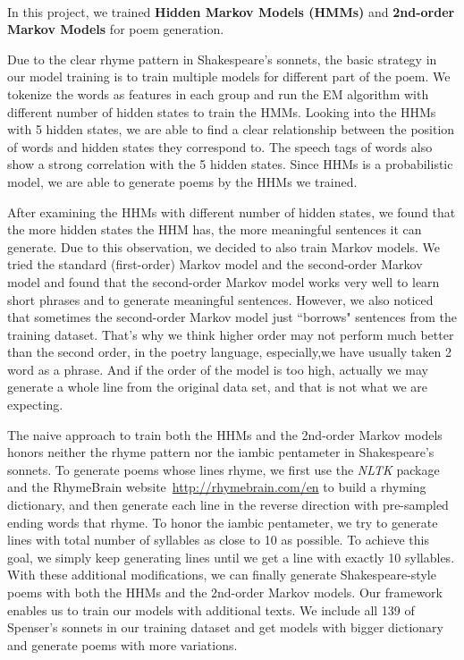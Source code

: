%
\paragraph{}
In this project, we trained \textbf{Hidden Markov Models (HMMs)} and \textbf{2nd-order Markov Models} for poem generation.

Due to the clear rhyme pattern in Shakespeare's sonnets, the basic strategy in our model training is to train multiple models for different part of the poem. We tokenize the words as features in each group and run the EM algorithm with different number of hidden states to train the HMMs. Looking into the HHMs with 5 hidden states, we are able to find a clear relationship between the position of words and hidden states they correspond to. The speech tags of words also show a strong correlation with the 5 hidden states. Since HHMs is a probabilistic model, we are able to generate poems by the HHMs we trained. 

After examining the HHMs with different number of hidden states, we found that the more hidden states the HHM has, the more meaningful sentences it can generate. Due to this observation, we decided to also train Markov models. We tried the standard (first-order) Markov model and the second-order Markov model and found that the second-order Markov model works very well to learn short phrases and to generate meaningful sentences. However, we also noticed that sometimes the second-order Markov model just ``borrows" sentences from the training dataset. That's why we think higher order may not perform much better than the second order, in the poetry language, especially,we have usually taken 2 word as a phrase. And if the order of the model is too high, actually we may generate a whole line from the original data set, and that is not what we are expecting. 

The naive approach to train both the HHMs and the 2nd-order Markov models honors neither the rhyme pattern nor the iambic pentameter in Shakespeare's sonnets. To generate poems whose lines rhyme, we first use the \textit{NLTK} package and the RhymeBrain website~\url{http://rhymebrain.com/en} to build a rhyming dictionary, and then generate each line in the reverse direction with pre-sampled ending words that rhyme. To honor the iambic pentameter, we try to generate lines with total number of syllables as close to 10 as possible. To achieve this goal, we simply keep generating lines until we get a line with exactly 10 syllables. With these additional modifications, we can finally generate Shakespeare-style poems with both the HHMs and the 2nd-order Markov models. Our framework enables us to train our models with additional texts. We include all 139 of Spenser's sonnets in our training dataset and get models with bigger dictionary and generate poems with more variations. 

